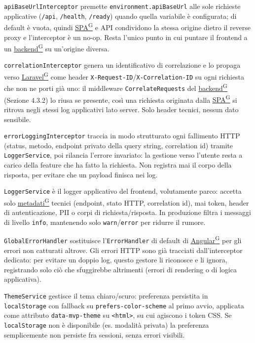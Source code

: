 \documentclass[a4paper,12pt]{article}
\providecommand{\glslink}[2]{\href{https://alittlebyte-19.github.io/Documentazione/glossario.html\#gls-#1}{\underline{#2}\textsuperscript{\scriptsize G}}}
\begin{document}
\begin{sloppypar}
\texttt{apiBaseUrlInterceptor} premette \texttt{environment.apiBaseUrl} alle sole richieste applicative (\texttt{/api}, \texttt{/health}, \texttt{/ready}) quando quella variabile è configurata; di default è vuota, quindi \glslink{spa-single-page-application}{SPA} e API condividono la stessa origine dietro il reverse proxy e l'interceptor è un no-op. Resta l'unico punto in cui puntare il frontend a un \glslink{backend}{backend} su un'origine diversa.

\texttt{correlationInterceptor} genera un identificativo di correlazione e lo propaga verso \glslink{laravel}{Laravel} come header \texttt{X-Request-ID}/\texttt{X-Correlation-ID} su ogni richiesta che non ne porti già uno: il middleware \texttt{CorrelateRequests} del \glslink{backend}{backend} (Sezione 4.3.2) lo riusa se presente, così una richiesta originata dalla \glslink{spa-single-page-application}{SPA} si ritrova negli stessi log applicativi lato server. Solo header tecnici, nessun dato sensibile.

\texttt{errorLoggingInterceptor} traccia in modo strutturato ogni fallimento HTTP (status, metodo, endpoint privato della query string, correlation id) tramite \texttt{LoggerService}, poi rilancia l'errore invariato: la gestione verso l'utente resta a carico della feature che ha fatto la richiesta. Non registra mai il corpo della risposta, per evitare che un payload finisca nei log.

\texttt{LoggerService} è il logger applicativo del frontend, volutamente parco: accetta solo \glslink{metadati}{metadati} tecnici (endpoint, stato HTTP, correlation id), mai token, header di autenticazione, PII o corpi di richiesta/risposta. In produzione filtra i messaggi di livello \texttt{info}, mantenendo solo \texttt{warn}/\texttt{error} per ridurre il rumore.

\texttt{GlobalErrorHandler} sostituisce l'\texttt{ErrorHandler} di default di \glslink{angular}{Angular} per gli errori non catturati altrove. Gli errori HTTP sono già tracciati dall'interceptor dedicato: per evitare un doppio log, questo gestore li riconosce e li ignora, registrando solo ciò che sfuggirebbe altrimenti (errori di rendering o di logica applicativa).

\texttt{ThemeService} gestisce il tema chiaro/scuro: preferenza persistita in \texttt{localStorage} con fallback su \texttt{prefers-color-scheme} al primo avvio, applicata come attributo \texttt{data-mvp-theme} su \texttt{<html>}, su cui agiscono i token CSS. Se \texttt{localStorage} non è disponibile (es. modalità privata) la preferenza semplicemente non persiste fra sessioni, senza errori visibili.


\end{sloppypar}
\end{document}

